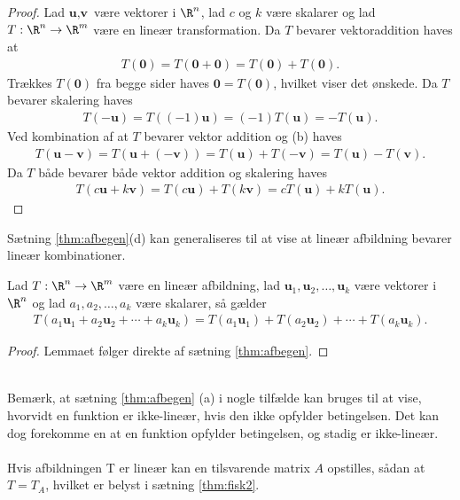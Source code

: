 %
\begin{proof}
Lad $\textbf{u}, \textbf{v}$ være vektorer i $\R^n$, lad $c$ og $k$ være skalarer og lad $T: \R^n \rightarrow \R^m$ være en lineær transformation.
Da $T$ bevarer vektoraddition haves at
%
\begin{align*}
T(\textbf{0}) = T(\textbf{0} + \textbf{0}) = T(\textbf{0}) + T(\textbf{0}).
\end{align*}
%
Trækkes $T(\textbf{0})$ fra begge sider haves $\textbf{0} = T(\textbf{0})$, hvilket viser det ønskede.
%
Da $T$ bevarer skalering haves
% 
\begin{align*}
T(-\textbf{u}) = T((-1)\textbf{u}) = (-1)T(\textbf{u}) = -T(\textbf{u}).
\end{align*}
%
Ved kombination af at $T$ bevarer vektor addition og (b) haves
%
\begin{align*}
T(\textbf{u}-\textbf{v}) = T(\textbf{u}+(-\textbf{v})) = T(\textbf{u})+T(-\textbf{v}) = T(\textbf{u}) - T(\textbf{v}).
\end{align*}
%
Da $T$ både bevarer både vektor addition og skalering haves 
%
\begin{align*}
T(c\textbf{u} + k\textbf{v}) = T(c\textbf{u}) + T(k\textbf{v}) = cT(\textbf{u}) + kT(\textbf{u}).
\end{align*}
\end{proof}
%
Sætning \ref{thm:afbegen}(d) kan generaliseres til at vise at lineær afbildning bevarer lineær kombinationer.
%
\begin{lem}{}{}
Lad $T:\R^n \rightarrow \R^m$ være en lineær afbildning, lad      $\textbf{u}_1,\textbf{u}_2,\ldots,\textbf{u}_k$ være vektorer i $\R^n$ og lad $a_1,a_2,\ldots,a_k$ være skalarer, så gælder
%
\begin{align*}
T(a_1\textbf{u}_1 + a_2\textbf{u}_2 + \cdots + a_k\textbf{u}_k) = T(a_1\textbf{u}_1) + T(a_2\textbf{u}_2) + \cdots + T(a_k\textbf{u}_k).
\end{align*}
%
\end{lem}
%
\begin{proof}
Lemmaet følger direkte af sætning \ref{thm:afbegen}.
\end{proof}
\\
%
Bemærk, at sætning \ref{thm:afbegen} (a) i nogle tilfælde kan bruges til at vise, hvorvidt en funktion er ikke-lineær, hvis den ikke opfylder betingelsen. 
Det kan dog forekomme en at en funktion opfylder betingelsen, og stadig er ikke-lineær.
% 
\\\\
% 
Hvis afbildningen T er lineær kan en tilsvarende matrix $A$ opstilles, sådan at $T=T_A$, hvilket er belyst i sætning \ref{thm:fisk2}.

